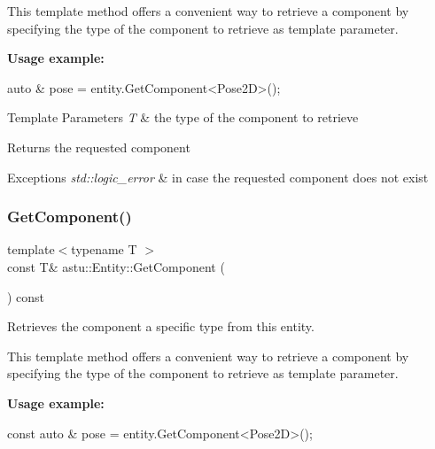 This template method offers a convenient way to retrieve a component by specifying the type of the component to retrieve as template parameter.

{\bfseries Usage example\+:} 
\begin{DoxyCode}
\textcolor{keyword}{auto} & pose = entity.GetComponent<Pose2D>();
\end{DoxyCode}



\begin{DoxyTemplParams}{Template Parameters}
{\em T} & the type of the component to retrieve \\
\hline
\end{DoxyTemplParams}
\begin{DoxyReturn}{Returns}
the requested component 
\end{DoxyReturn}

\begin{DoxyExceptions}{Exceptions}
{\em std\+::logic\+\_\+error} & in case the requested component does not exist \\
\hline
\end{DoxyExceptions}
\mbox{\label{classastu_1_1Entity_a140865878b65472e3c11fda593ef80ec}} 
\subsubsection{\texorpdfstring{Get\+Component()}{GetComponent()}\hspace{0.1cm}{\footnotesize\ttfamily [4/4]}}
{\footnotesize\ttfamily template$<$typename T $>$ \\
const T\& astu\+::\+Entity\+::\+Get\+Component (\begin{DoxyParamCaption}{ }\end{DoxyParamCaption}) const\hspace{0.3cm}{\ttfamily [inline]}}

Retrieves the component a specific type from this entity.

This template method offers a convenient way to retrieve a component by specifying the type of the component to retrieve as template parameter.

{\bfseries Usage example\+:} 
\begin{DoxyCode}
\textcolor{keyword}{const} \textcolor{keyword}{auto} & pose = entity.GetComponent<Pose2D>();
\end{DoxyCode}



